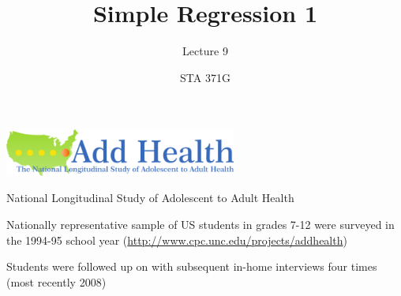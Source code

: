 \documentclass{beamer}\usepackage[]{graphicx}\usepackage[]{color}
\title{Simple Regression 1}
\subtitle{Lecture 9}
\author{STA 371G}
\begin{document}
  
  
  

  \frame{\maketitle}



  \begin{darkframes}
    \begin{frame}
      \begin{center}
        \includegraphics[width=3in]{add-health}

        \bigskip
        National Longitudinal Study of Adolescent to Adult Health

        \bigskip
        Nationally representative sample of US students in grades 7-12 were surveyed in the 1994-95 school year (\url{http://www.cpc.unc.edu/projects/addhealth})

        \bigskip
        Students were followed up on with subsequent in-home interviews four times (most recently 2008)
      \end{center}
    \end{frame}


\end{darkframes}
\end{document}
